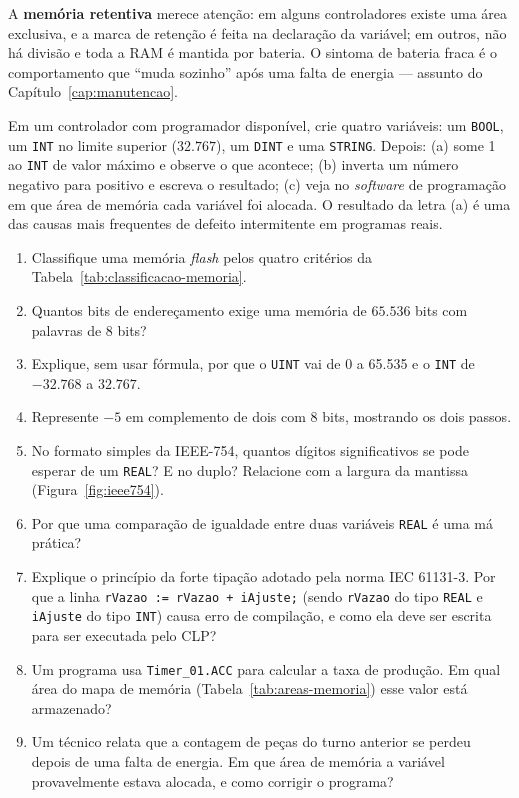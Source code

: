 A \textbf{memória retentiva} merece atenção: em alguns controladores existe uma área exclusiva, e a
marca de retenção é feita na declaração da variável; em outros, não há divisão e toda a RAM é
mantida por bateria. O sintoma de bateria fraca é o comportamento que ``muda sozinho'' após uma
falta de energia --- assunto do Capítulo~\ref{cap:manutencao}.

\begin{pratica}
Em um controlador com programador disponível, crie quatro variáveis: um \texttt{BOOL}, um
\texttt{INT} no limite superior ($32.767$), um \texttt{DINT} e uma \texttt{STRING}. Depois:
(a) some 1 ao \texttt{INT} de valor máximo e observe o que acontece;
(b) inverta um número negativo para positivo e escreva o resultado;
(c) veja no \emph{software} de programação em que área de memória cada variável foi alocada.
O resultado da letra (a) é uma das causas mais frequentes de defeito intermitente em programas reais.
\end{pratica}

\begin{exercicios}
\begin{enumerate}[label=\alph*)]
  \item Classifique uma memória \emph{flash} pelos quatro critérios da
        Tabela~\ref{tab:classificacao-memoria}.
  \item Quantos bits de endereçamento exige uma memória de $65.536$ bits com palavras de 8 bits?
  \item Explique, sem usar fórmula, por que o \texttt{UINT} vai de 0 a 65.535 e o \texttt{INT} de
        $-32.768$ a $32.767$.
  \item Represente $-5$ em complemento de dois com 8 bits, mostrando os dois passos.
  \item No formato simples da IEEE-754, quantos dígitos significativos se pode esperar de um
        \texttt{REAL}? E no duplo? Relacione com a largura da mantissa
        (Figura~\ref{fig:ieee754}).
  \item Por que uma comparação de igualdade entre duas variáveis \texttt{REAL} é uma má prática?
  \item Explique o princípio da forte tipação adotado pela norma IEC 61131-3. Por que a linha
        \texttt{rVazao := rVazao + iAjuste;} (sendo \texttt{rVazao} do tipo \texttt{REAL} e
        \texttt{iAjuste} do tipo \texttt{INT}) causa erro de compilação, e como ela deve ser
        escrita para ser executada pelo CLP?
  \item Um programa usa \texttt{Timer\_01.ACC} para calcular a taxa de produção. Em qual área do
        mapa de memória (Tabela~\ref{tab:areas-memoria}) esse valor está armazenado?
  \item Um técnico relata que a contagem de peças do turno anterior se perdeu depois de uma falta de
        energia. Em que área de memória a variável provavelmente estava alocada, e como corrigir o
        programa?
\end{enumerate}
\end{exercicios}
